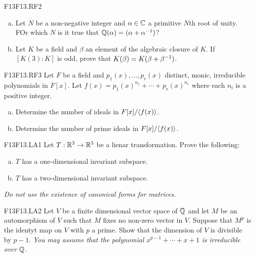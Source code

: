 \documentclass[../AlgebraQualSolutions.tex]{subfiles}
\begin{document}
\begin{prob}{F13}{F13.RF2}

	\begin{enumerate}[(a)]
		\item Let $N$ be a non-negative integer and $\alpha \in \mathbb{C}$ a primitive $N$th root of unity. FOr which $N$ is it true that $\mathbb{Q}(\alpha) = (\alpha + \alpha^{-1})$?
		\item Let $K$ be a field and $\beta$ an element of the algebraic closure of $K$. If $[K(3):K]$ is odd, prove that $K(\beta) = K(\beta + \beta^{-1})$.
	\end{enumerate}
\end{prob}

\begin{prob}{F13}{F13.RF3}
	Let $F$ be a field and $p_1(x), \ldots, p_r(x)$ distinct, monic, irreducible polynomials in $F[x]$. Let $f(x) = p_1(x)^{n_1} + \cdots + p_r(x)^{n_r}$ where each $n_i$ is a positive integer.

	\begin{enumerate}[(a)]
		\item Determine the number of ideals in $F[x]/\langle f(x) \rangle$.
		\item Determine the number of prime ideals in $F[x]/\langle f(x) \rangle$.
	\end{enumerate}
\end{prob}

\begin{prob}{F13}{F13.LA1}
	Let $T: \mathbb{R}^3 \to \mathbb{R}^3$ be a lienar transformation. Prove the following:
	\begin{enumerate}[(a)]
		\item $T$ has a one-dimensional invariant subspace.
		\item $T$ has a two-dimensional invariant subspace.
	\end{enumerate}

	\emph{ Do not use the existence of canonical forms for matrices.}
\end{prob}

\begin{prob}{F13}{F13.LA2}
	Let $V$ be a finite dimensional vector space of $\mathbb{Q}$ and let $M$ be an automorphism of $V$ such that $M$ fixes no non-zero vector in $V$. Suppose that $M^p$ is the identyt map on $V$ with $p$ a prime. Show that the dimension of $V$ is divisible by $p-1$. \emph{ You may assume that the polynomial $x^{p-1} + \cdots + x + 1$ is irreducible  over $\mathbb{Q}$.}
\end{prob}
\end{document}
